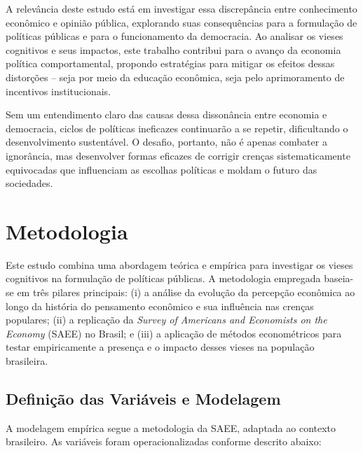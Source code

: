 A relevância deste estudo está em investigar essa discrepância entre conhecimento econômico e opinião pública, explorando suas consequências para a formulação de políticas públicas e para o funcionamento da democracia. Ao analisar os vieses cognitivos e seus impactos, este trabalho contribui para o avanço da economia política comportamental, propondo estratégias para mitigar os efeitos dessas distorções – seja por meio da educação econômica, seja pelo aprimoramento de incentivos institucionais.

Sem um entendimento claro das causas dessa dissonância entre economia e democracia, ciclos de políticas ineficazes continuarão a se repetir, dificultando o desenvolvimento sustentável. O desafio, portanto, não é apenas combater a ignorância, mas desenvolver formas eficazes de corrigir crenças sistematicamente equivocadas que influenciam as escolhas políticas e moldam o futuro das sociedades.


\section{Metodologia} %

Este estudo combina uma abordagem teórica e empírica para investigar os vieses cognitivos na formulação de políticas públicas. A metodologia empregada baseia-se em três pilares principais: 
(i) a análise da evolução da percepção econômica ao longo da história do pensamento econômico e sua influência nas crenças populares; 
(ii) a replicação da \textit{Survey of Americans and Economists on the Economy} (SAEE) no Brasil; e 
(iii) a aplicação de métodos econométricos para testar empiricamente a presença e o impacto desses vieses na população brasileira.

\subsection{Definição das Variáveis e Modelagem} %

A modelagem empírica segue a metodologia da SAEE, adaptada ao contexto brasileiro. As variáveis foram operacionalizadas conforme descrito abaixo:

\renewcommand{\arraystretch}{1.3}

